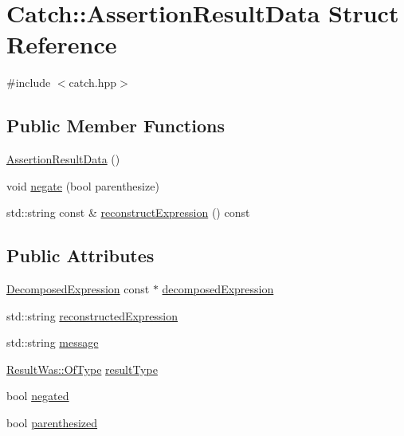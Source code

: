 \hypertarget{struct_catch_1_1_assertion_result_data}{}\section{Catch\+:\+:Assertion\+Result\+Data Struct Reference}
\label{struct_catch_1_1_assertion_result_data}


{\ttfamily \#include $<$catch.\+hpp$>$}

\subsection*{Public Member Functions}
\begin{DoxyCompactItemize}
\item 
\mbox{\hyperlink{struct_catch_1_1_assertion_result_data_a37179edde9f853f22d4456677fd97701}{Assertion\+Result\+Data}} ()
\item 
void \mbox{\hyperlink{struct_catch_1_1_assertion_result_data_a3b4df7cd1f8228ea1144b5cd0af6006a}{negate}} (bool parenthesize)
\item 
std\+::string const  \& \mbox{\hyperlink{struct_catch_1_1_assertion_result_data_adbc0629083cd2e76c3a78696453443b0}{reconstruct\+Expression}} () const
\end{DoxyCompactItemize}
\subsection*{Public Attributes}
\begin{DoxyCompactItemize}
\item 
\mbox{\hyperlink{struct_catch_1_1_decomposed_expression}{Decomposed\+Expression}} const  $\ast$ \mbox{\hyperlink{struct_catch_1_1_assertion_result_data_a45b2bf2ed11da83d09dd78a2b7a44cd4}{decomposed\+Expression}}
\item 
std\+::string \mbox{\hyperlink{struct_catch_1_1_assertion_result_data_a9e809d36fffbeb1c7d0cbe7382dd9595}{reconstructed\+Expression}}
\item 
std\+::string \mbox{\hyperlink{struct_catch_1_1_assertion_result_data_ac34215803c4c4a88f795879f61c1f7b4}{message}}
\item 
\mbox{\hyperlink{struct_catch_1_1_result_was_a624e1ee3661fcf6094ceef1f654601ef}{Result\+Was\+::\+Of\+Type}} \mbox{\hyperlink{struct_catch_1_1_assertion_result_data_a7ceab4a7ff722aec5587e3748caf66b7}{result\+Type}}
\item 
bool \mbox{\hyperlink{struct_catch_1_1_assertion_result_data_a17773c6f999cfded12e470b0321694a1}{negated}}
\item 
bool \mbox{\hyperlink{struct_catch_1_1_assertion_result_data_a8418e3744b5486cb7f0d79c84569078e}{parenthesized}}
\end{DoxyCompactItemize}


